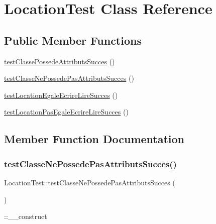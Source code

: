 \hypertarget{class_location_test}{}\section{Location\+Test Class Reference}
\label{class_location_test}
\subsection*{Public Member Functions}
\begin{DoxyCompactItemize}
\item 
\hyperlink{class_location_test_adb2b63e0796b784ca2a3b2ff3cfe6a10}{test\+Classe\+Possede\+Attributs\+Succes} ()
\item 
\hyperlink{class_location_test_ac66278825b05d73f68570d1ce912f7ef}{test\+Classe\+Ne\+Possede\+Pas\+Attributs\+Succes} ()
\item 
\hyperlink{class_location_test_a285e512b70169d88ec12b85e72563a6b}{test\+Location\+Egale\+Ecrire\+Lire\+Succes} ()
\item 
\hyperlink{class_location_test_a6ad1937baef793c562be46e4ff96f0ec}{test\+Location\+Pas\+Egale\+Ecrire\+Lire\+Succes} ()
\end{DoxyCompactItemize}


\subsection{Member Function Documentation}
\mbox{\label{class_location_test_ac66278825b05d73f68570d1ce912f7ef}} 
\subsubsection{\texorpdfstring{test\+Classe\+Ne\+Possede\+Pas\+Attributs\+Succes()}{testClasseNePossedePasAttributsSucces()}}
{\footnotesize\ttfamily Location\+Test\+::test\+Classe\+Ne\+Possede\+Pas\+Attributs\+Succes (\begin{DoxyParamCaption}{ }\end{DoxyParamCaption})}

\+::\+\_\+\+\_\+construct \mbox{\label{class_location_test_adb2b63e0796b784ca2a3b2ff3cfe6a10}} 
